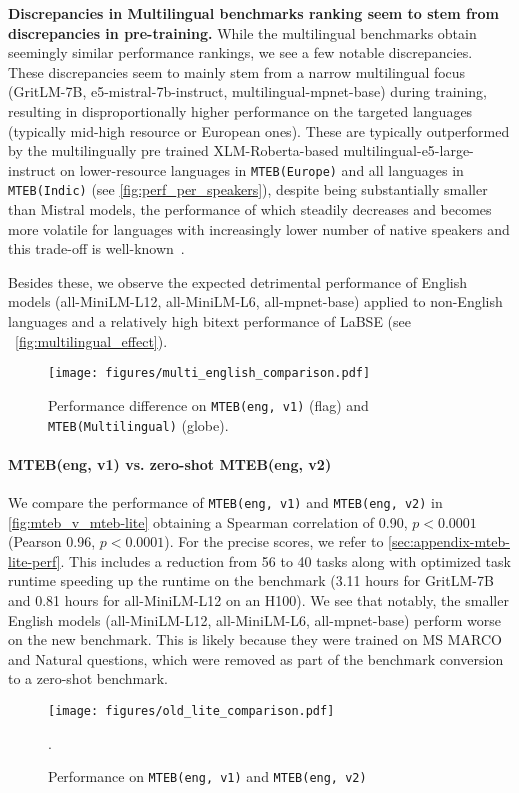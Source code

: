 \textbf{Discrepancies in Multilingual benchmarks ranking seem to stem from discrepancies in pre-training.} While the multilingual benchmarks obtain seemingly similar performance rankings, we see a few notable discrepancies. These discrepancies seem to mainly stem from a narrow multilingual focus (GritLM-7B, e5-mistral-7b-instruct, multilingual-mpnet-base) during training, resulting in disproportionally higher performance on the targeted languages (typically mid-high resource or European ones). 
These are typically outperformed by the multilingually pre trained XLM-Roberta-based multilingual-e5-large-instruct on lower-resource languages in \texttt{MTEB(Europe)} and all languages in \texttt{MTEB(Indic)} (see \autoref{fig:perf_per_speakers}),
despite being substantially smaller than Mistral models,
the performance of which steadily decreases and becomes more volatile for languages with increasingly lower number of native speakers and this trade-off is well-known~\citep{xue2020mt5}. 

Besides these, we observe the expected detrimental performance of English models (all-MiniLM-L12, all-MiniLM-L6, all-mpnet-base) applied to non-English languages and a relatively high bitext performance of LaBSE (see ~\autoref{fig:multilingual_effect}).

\begin{figure}
    \centering
    \texttt{[image: figures/multi\_english\_comparison.pdf]}
    \caption{Performance difference on \texttt{MTEB(eng, v1)} (flag) and \texttt{MTEB(Multilingual)} (globe).}
    \label{fig:multilingual_effect}
\end{figure}


\paragraph{MTEB(eng, v1) vs. zero-shot MTEB(eng, v2)}
\label{sec:mteb_english_vs_lite}

We compare the performance of \texttt{MTEB(eng, v1)} and \texttt{MTEB(eng, v2)} in \autoref{fig:mteb_v_mteb-lite} obtaining a Spearman correlation of 0.90, $p<0.0001$ (Pearson 0.96, $p<0.0001$). For the precise scores, we refer to \autoref{sec:appendix-mteb-lite-perf}. This includes a reduction from 56 to 40 tasks along with optimized task runtime speeding up the runtime on the benchmark (3.11 hours for GritLM-7B and 0.81 hours for all-MiniLM-L12 on an H100). We see that notably, the smaller English models (all-MiniLM-L12, all-MiniLM-L6, all-mpnet-base) perform worse on the new benchmark. This is likely because they were trained on MS MARCO and Natural questions, which were removed as part of the benchmark conversion to a zero-shot benchmark.

\begin{figure}
    \centering
    \texttt{[image: figures/old\_lite\_comparison.pdf]}
    \caption{Performance on \texttt{MTEB(eng, v1)} and \texttt{MTEB(eng, v2)}}.
    \label{fig:mteb_v_mteb-lite}
\end{figure}